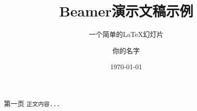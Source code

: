 \documentclass[10pt,aspectratio=169]{beamer}
\title{Beamer演示文稿示例}
\subtitle{一个简单的LaTeX幻灯片}
\author{你的名字}
\institute{某某大学}
\date{\today}
\begin{document}
\begin{frame}
\titlepage
\end{frame}
\begin{frame}{第一页}
      \texttt{正文内容...}
     
\end{frame}
\end{document}
